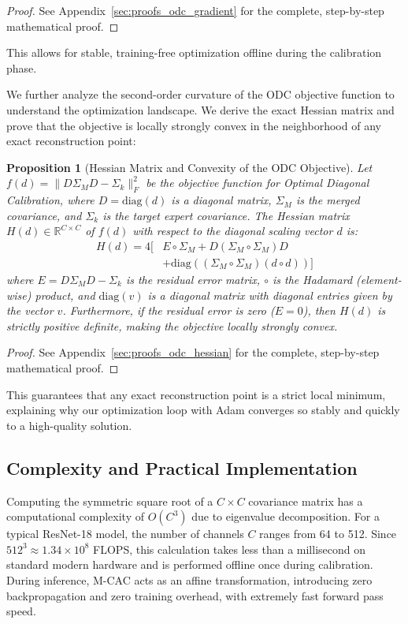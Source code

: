 \documentclass{article}
\theoremstyle{plain}
\newtheorem{proposition}[theorem]{Proposition}
\theoremstyle{definition}
\theoremstyle{remark}
\begin{document}
\begin{proof}
See Appendix~\ref{sec:proofs_odc_gradient} for the complete, step-by-step mathematical proof.
\end{proof}
This allows for stable, training-free optimization offline during the calibration phase.

We further analyze the second-order curvature of the ODC objective function to understand the optimization landscape. We derive the exact Hessian matrix and prove that the objective is locally strongly convex in the neighborhood of any exact reconstruction point:

\begin{proposition}[Hessian Matrix and Convexity of the ODC Objective]
Let $f(d) = \| D \Sigma_M D - \Sigma_k \|_F^2$ be the objective function for Optimal Diagonal Calibration, where $D = \text{diag}(d)$ is a diagonal matrix, $\Sigma_M$ is the merged covariance, and $\Sigma_k$ is the target expert covariance. The Hessian matrix $H(d) \in \mathbb{R}^{C \times C}$ of $f(d)$ with respect to the diagonal scaling vector $d$ is:
\begin{align}
  H(d) = 4 \Big[ &E \circ \Sigma_M + D (\Sigma_M \circ \Sigma_M) D \nonumber \\
  &+ \text{diag}\left( (\Sigma_M \circ \Sigma_M) (d \circ d) \right) \Big]
\end{align}
where $E = D \Sigma_M D - \Sigma_k$ is the residual error matrix, $\circ$ is the Hadamard (element-wise) product, and $\text{diag}(v)$ is a diagonal matrix with diagonal entries given by the vector $v$. Furthermore, if the residual error is zero ($E = 0$), then $H(d)$ is strictly positive definite, making the objective locally strongly convex.
\end{proposition}

\begin{proof}
See Appendix~\ref{sec:proofs_odc_hessian} for the complete, step-by-step mathematical proof.
\end{proof}
This guarantees that any exact reconstruction point is a strict local minimum, explaining why our optimization loop with Adam converges so stably and quickly to a high-quality solution.

\subsection{Complexity and Practical Implementation}
Computing the symmetric square root of a $C \times C$ covariance matrix has a computational complexity of $O(C^3)$ due to eigenvalue decomposition. For a typical ResNet-18 model, the number of channels $C$ ranges from 64 to 512. Since $512^3 \approx 1.34 \times 10^8$ FLOPS, this calculation takes less than a millisecond on standard modern hardware and is performed offline once during calibration. During inference, M-CAC acts as an affine transformation, introducing zero backpropagation and zero training overhead, with extremely fast forward pass speed.
\end{document}
